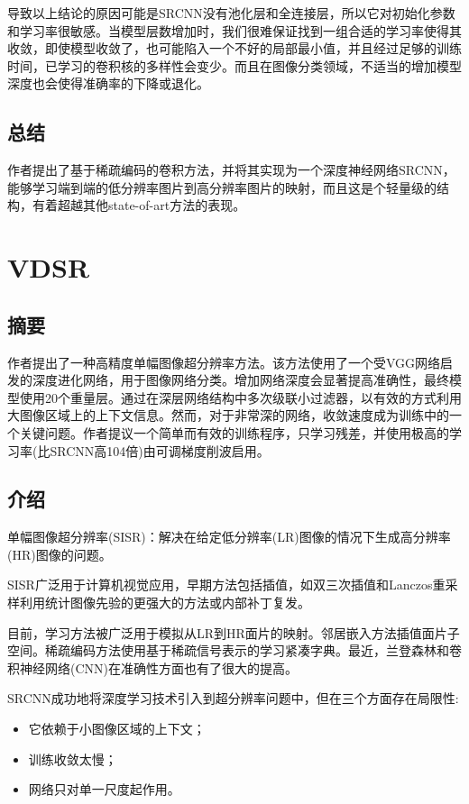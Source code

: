 \documentclass[UTF8,a4paper,10pt]{ctexrep}
\begin{document}
导致以上结论的原因可能是SRCNN没有池化层和全连接层，所以它对初始化参数和学习率很敏感。当模型层数增加时，我们很难保证找到一组合适的学习率使得其收敛，即使模型收敛了，也可能陷入一个不好的局部最小值，并且经过足够的训练时间，已学习的卷积核的多样性会变少。而且在图像分类领域，不适当的增加模型深度也会使得准确率的下降或退化。

\section{总结}
作者提出了基于稀疏编码的卷积方法，并将其实现为一个深度神经网络SRCNN，能够学习端到端的低分辨率图片到高分辨率图片的映射，而且这是个轻量级的结构，有着超越其他state-of-art方法的表现。


\chapter{VDSR}
\section{摘要}

作者提出了一种高精度单幅图像超分辨率方法。该方法使用了一个受VGG网络启发的深度进化网络，用于图像网络分类。增加网络深度会显著提高准确性，最终模型使用20个重量层。通过在深层网络结构中多次级联小过滤器，以有效的方式利用大图像区域上的上下文信息。然而，对于非常深的网络，收敛速度成为训练中的一个关键问题。作者提议一个简单而有效的训练程序，只学习残差，并使用极高的学习率(比SRCNN高104倍)由可调梯度削波启用。

\section{介绍}

单幅图像超分辨率(SISR)：解决在给定低分辨率(LR)图像的情况下生成高分辨率(HR)图像的问题。

SISR广泛用于计算机视觉应用，早期方法包括插值，如双三次插值和Lanczos重采样利用统计图像先验的更强大的方法或内部补丁复发。

目前，学习方法被广泛用于模拟从LR到HR面片的映射。邻居嵌入方法插值面片子空间。稀疏编码方法使用基于稀疏信号表示的学习紧凑字典。最近，兰登森林和卷积神经网络(CNN)在准确性方面也有了很大的提高。

SRCNN成功地将深度学习技术引入到超分辨率问题中，但在三个方面存在局限性:
\begin{itemize}
  \item 它依赖于小图像区域的上下文；
  \item 训练收敛太慢；
  \item 网络只对单一尺度起作用。
\end{itemize}
\end{document}
